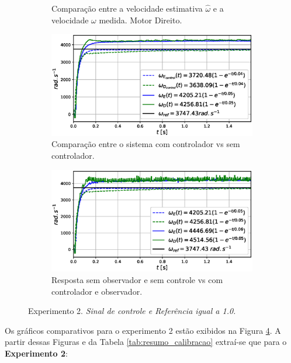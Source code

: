 \begin{figure}[H]
\begin{subfigure}{.5\textwidth}
    \caption{Comparação entre a velocidade estimativa $\hat{\omega}$ e a velocidade $\omega$ medida. Motor Direito.}
    \label{fig:exp02:filtragem_direito}
    \end{subfigure}
    \hfill
    \begin{subfigure}{.5\textwidth}
    \centering
    \includegraphics[width=\textwidth]{figuras/resultados/exp02/controlador_vs_sem_controlador100.eps}
    \caption{Comparação entre o sistema com controlador vs sem controlador.}
    \label{fig:exp02:controle}
    \end{subfigure}
    \hfill
    \begin{subfigure}{.5\textwidth}
    \centering
    \includegraphics[width=\textwidth]{figuras/resultados/exp02/antes_vs_depois100.eps}
    \caption{Resposta sem observador e sem controle vs com controlador e observador.}
    \label{fig:exp02:antes_vs_depois}
    \end{subfigure}
    
    \caption{Experimento 2. \emph{Sinal de controle e Referência igual a 1.0.}}
    \label{fig:exp02_100}
\end{figure}

Os gráficos comparativos para o experimento 2 estão exibidos na Figura \ref{fig:exp02_100}. A partir dessas Figuras e da Tabela \ref{tab:resumo_calibracao} extraí-se que para o \textbf{Experimento 2}:

